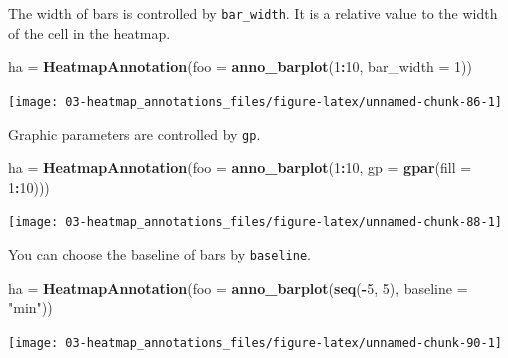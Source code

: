 \documentclass[]{book}
\newenvironment{Shaded}{\begin{snugshade}}{\end{snugshade}}
\newcommand{\KeywordTok}[1]{\textcolor[rgb]{0.13,0.29,0.53}{\textbf{#1}}}
\newcommand{\DataTypeTok}[1]{\textcolor[rgb]{0.13,0.29,0.53}{#1}}
\newcommand{\DecValTok}[1]{\textcolor[rgb]{0.00,0.00,0.81}{#1}}
\newcommand{\StringTok}[1]{\textcolor[rgb]{0.31,0.60,0.02}{#1}}
\newcommand{\OperatorTok}[1]{\textcolor[rgb]{0.81,0.36,0.00}{\textbf{#1}}}
\newcommand{\NormalTok}[1]{#1}
\theoremstyle{definition}
\theoremstyle{definition}
\theoremstyle{definition}
\theoremstyle{remark}
\begin{document}
The width of bars is controlled by \texttt{bar\_width}. It is a relative
value to the width of the cell in the heatmap.

\begin{Shaded}
\begin{Highlighting}[]
\NormalTok{ha =}\StringTok{ }\KeywordTok{HeatmapAnnotation}\NormalTok{(}\DataTypeTok{foo =} \KeywordTok{anno_barplot}\NormalTok{(}\DecValTok{1}\OperatorTok{:}\DecValTok{10}\NormalTok{, }\DataTypeTok{bar_width =} \DecValTok{1}\NormalTok{))}
\end{Highlighting}
\end{Shaded}

\begin{center}\texttt{[image: 03-heatmap\_annotations\_files/figure-latex/unnamed-chunk-86-1]} \end{center}

Graphic parameters are controlled by \texttt{gp}.

\begin{Shaded}
\begin{Highlighting}[]
\NormalTok{ha =}\StringTok{ }\KeywordTok{HeatmapAnnotation}\NormalTok{(}\DataTypeTok{foo =} \KeywordTok{anno_barplot}\NormalTok{(}\DecValTok{1}\OperatorTok{:}\DecValTok{10}\NormalTok{, }\DataTypeTok{gp =} \KeywordTok{gpar}\NormalTok{(}\DataTypeTok{fill =} \DecValTok{1}\OperatorTok{:}\DecValTok{10}\NormalTok{)))}
\end{Highlighting}
\end{Shaded}

\begin{center}\texttt{[image: 03-heatmap\_annotations\_files/figure-latex/unnamed-chunk-88-1]} \end{center}

You can choose the baseline of bars by \texttt{baseline}.

\begin{Shaded}
\begin{Highlighting}[]
\NormalTok{ha =}\StringTok{ }\KeywordTok{HeatmapAnnotation}\NormalTok{(}\DataTypeTok{foo =} \KeywordTok{anno_barplot}\NormalTok{(}\KeywordTok{seq}\NormalTok{(}\OperatorTok{-}\DecValTok{5}\NormalTok{, }\DecValTok{5}\NormalTok{), }\DataTypeTok{baseline =} \StringTok{"min"}\NormalTok{))}
\end{Highlighting}
\end{Shaded}

\begin{center}\texttt{[image: 03-heatmap\_annotations\_files/figure-latex/unnamed-chunk-90-1]} \end{center}
\end{document}
